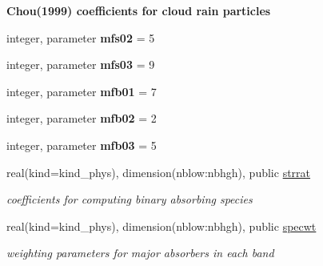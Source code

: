 \begin{Indent}\textbf{ Chou(1999) coefficients for cloud rain particles}\par
\begin{DoxyCompactItemize}
\item 
\mbox{\label{namespacemodule__radsw__sflux_acca3bbc0dd125a3e8c3734c58c48e79b}} 
integer, parameter {\bfseries mfs02} = 5
\item 
\mbox{\label{namespacemodule__radsw__sflux_a5bd55a5106ce82bd47250d38d9b8f22a}} 
integer, parameter {\bfseries mfs03} = 9
\item 
\mbox{\label{namespacemodule__radsw__sflux_a08a0f1278962ac27634169ea7632bc70}} 
integer, parameter {\bfseries mfb01} = 7
\item 
\mbox{\label{namespacemodule__radsw__sflux_afdf71cabed6ae0076d98ff0e563dbc61}} 
integer, parameter {\bfseries mfb02} = 2
\item 
\mbox{\label{namespacemodule__radsw__sflux_a2e3b510d781c596fa0bb9b1359a988dd}} 
integer, parameter {\bfseries mfb03} = 5
\item 
\mbox{\label{namespacemodule__radsw__sflux_aee2a2275da028b0960c5c1c8a34f46cf}} 
real(kind=kind\+\_\+phys), dimension(nblow\+:nbhgh), public \hyperlink{namespacemodule__radsw__sflux_aee2a2275da028b0960c5c1c8a34f46cf}{strrat}
\begin{DoxyCompactList}\small\item\em coefficients for computing binary absorbing species \end{DoxyCompactList}\item 
\mbox{\label{namespacemodule__radsw__sflux_a7d1a386e92555bcb09239ab098d8b398}} 
real(kind=kind\+\_\+phys), dimension(nblow\+:nbhgh), public \hyperlink{namespacemodule__radsw__sflux_a7d1a386e92555bcb09239ab098d8b398}{specwt}
\begin{DoxyCompactList}\small\item\em weighting parameters for major absorbers in each band \end{DoxyCompactList}\item 

\end{DoxyCompactItemize}
\end{Indent}
